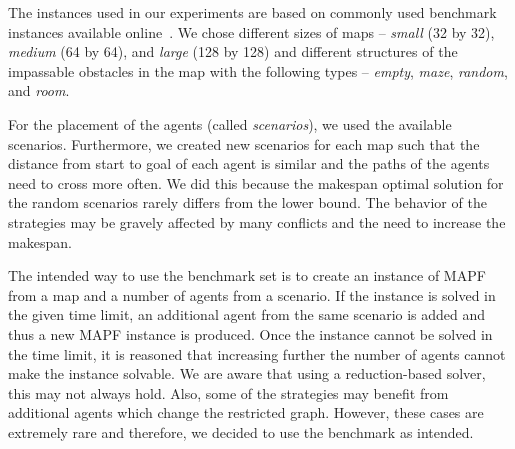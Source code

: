 %
The instances used in our experiments are based on commonly used benchmark instances available online~\cite{stern2019mapfVarians}. We chose different sizes of maps -- \emph{small} (32 by 32), \emph{medium} (64 by 64), and \emph{large} (128 by 128) and different structures of the impassable obstacles in the map with the following types -- \emph{empty}, \emph{maze}, \emph{random}, and \emph{room}. %


For the placement of the agents (called \emph{scenarios}), we used the available scenarios. %
Furthermore, we created new scenarios for each map such that the distance from start to goal of each agent is similar and the paths of the agents need to cross more often. We did this because the makespan optimal solution for the random scenarios rarely differs from the lower bound. %
The behavior of the strategies may be gravely affected by many conflicts and the need to increase the makespan.%

The intended way to use the benchmark set is to create an instance of MAPF from a map and a number of agents from a scenario. If the instance is solved in the given time limit, an additional agent from the same scenario is added and thus a new MAPF instance is produced. Once the instance cannot be solved in the time limit, it is reasoned that increasing further the number of agents cannot make the instance solvable. We are aware that using a reduction-based solver, this may not always hold. Also, some of the strategies may benefit from additional agents which change the restricted graph. However, these cases are extremely rare and therefore, we decided to use the benchmark as intended.


